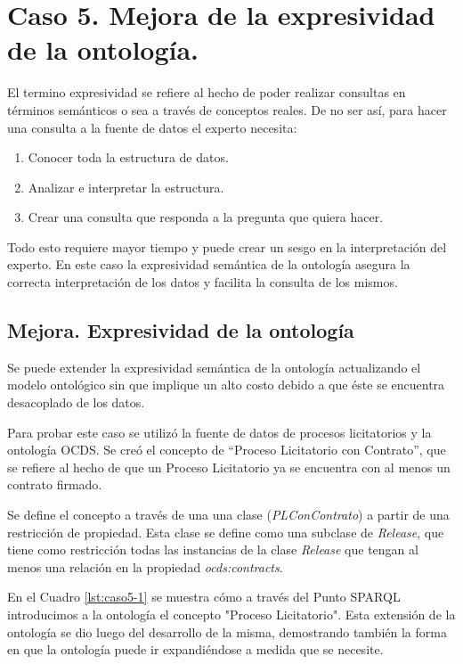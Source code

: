 \section{Caso 5. Mejora de la expresividad de la ontología. }
\label{section:caso5}

El termino expresividad se refiere al hecho de poder realizar consultas en términos semánticos o sea a través de conceptos reales. De no ser así, para hacer una consulta a la fuente de datos el experto necesita:

\begin{enumerate}
    \item Conocer toda la estructura de datos.
    \item Analizar e interpretar la estructura.
    \item Crear una consulta que responda a la pregunta que quiera hacer.
\end{enumerate}

Todo esto requiere mayor tiempo y puede crear un sesgo en la interpretación del experto. En este caso la expresividad semántica de la ontología asegura la correcta interpretación de los datos y facilita la consulta de los mismos.


\subsection{Mejora. Expresividad de la ontología}
Se puede extender la expresividad semántica de la ontología actualizando el modelo ontológico sin que implique un alto costo debido a que éste se encuentra desacoplado de los datos.

Para probar este caso se utilizó la fuente de datos de procesos licitatorios y la ontología OCDS.  Se creó el  concepto  de “Proceso Licitatorio con Contrato”, que se refiere al hecho de que un Proceso Licitatorio ya se encuentra con al menos un contrato firmado.

Se define el concepto a través de una una clase (\textit{PLConContrato}) a partir de una restricción de propiedad. Esta clase se define como una subclase de \textit{Release}, que tiene como restricción todas las instancias de la clase \textit{Release} que tengan al menos una relación en la propiedad \textit{ocds:contracts}.

En el Cuadro \ref{lst:caso5-1} se muestra cómo a través del Punto SPARQL introducimos a la ontología el concepto "Proceso Licitatorio". Esta extensión de la ontología se dio luego del desarrollo de la misma, demostrando también la forma en que la ontología puede ir expandiéndose a medida que se necesite.

